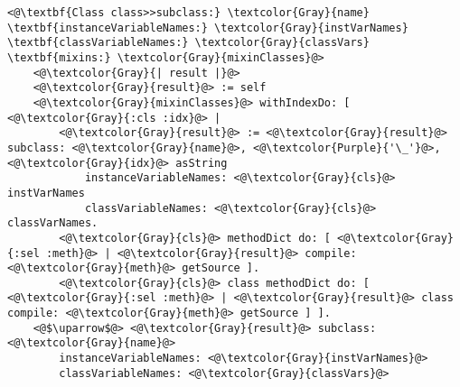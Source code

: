 \documentclass[12pt]{article}
\begin{document}
\begin{lstlisting}
<@\textbf{Class class>>subclass:} \textcolor{Gray}{name} \textbf{instanceVariableNames:} \textcolor{Gray}{instVarNames} \textbf{classVariableNames:} \textcolor{Gray}{classVars} \textbf{mixins:} \textcolor{Gray}{mixinClasses}@>
    <@\textcolor{Gray}{| result |}@>
    <@\textcolor{Gray}{result}@> := self 
    <@\textcolor{Gray}{mixinClasses}@> withIndexDo: [ <@\textcolor{Gray}{:cls :idx}@> |
        <@\textcolor{Gray}{result}@> := <@\textcolor{Gray}{result}@> subclass: <@\textcolor{Gray}{name}@>, <@\textcolor{Purple}{'\_'}@>, <@\textcolor{Gray}{idx}@> asString
            instanceVariableNames: <@\textcolor{Gray}{cls}@> instVarNames
            classVariableNames: <@\textcolor{Gray}{cls}@> classVarNames.
        <@\textcolor{Gray}{cls}@> methodDict do: [ <@\textcolor{Gray}{:sel :meth}@> | <@\textcolor{Gray}{result}@> compile: <@\textcolor{Gray}{meth}@> getSource ].
        <@\textcolor{Gray}{cls}@> class methodDict do: [ <@\textcolor{Gray}{:sel :meth}@> | <@\textcolor{Gray}{result}@> class compile: <@\textcolor{Gray}{meth}@> getSource ] ].
    <@$\uparrow$@> <@\textcolor{Gray}{result}@> subclass: <@\textcolor{Gray}{name}@>
        instanceVariableNames: <@\textcolor{Gray}{instVarNames}@>
        classVariableNames: <@\textcolor{Gray}{classVars}@>
\end{lstlisting}




\end{document}
